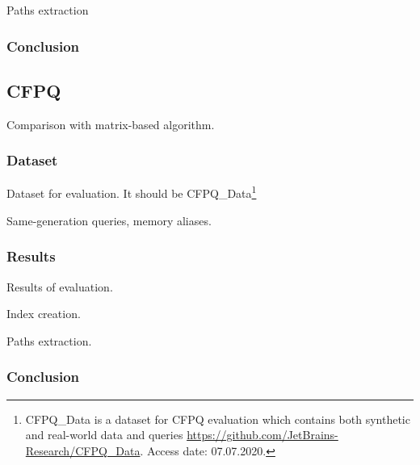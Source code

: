 Paths extraction

\subsubsection{Conclusion}

\subsection{CFPQ}

Comparison with matrix-based algorithm.

\subsubsection{Dataset}

Dataset for evaluation. 
It should be CFPQ\_Data\footnote{CFPQ\_Data is a dataset for CFPQ evaluation which contains both synthetic and real-world data and queries \url{https://github.com/JetBrains-Research/CFPQ\_Data}. Access date: 07.07.2020.}

Same-generation queries, memory aliases.

\subsubsection{Results}

Results of evaluation.

Index creation.

Paths extraction.

\subsubsection{Conclusion}
